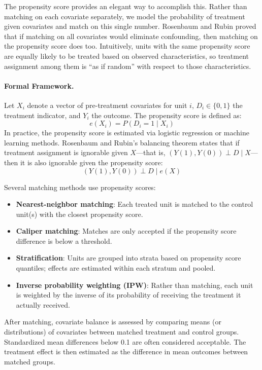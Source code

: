 The propensity score provides an elegant way to accomplish this.
Rather than matching on each covariate separately, we model the probability of treatment given covariates and match on this single number.
Rosenbaum and Rubin proved that if matching on all covariates would eliminate confounding, then matching on the propensity score does too.
Intuitively, units with the same propensity score are equally likely to be treated based on observed characteristics, so treatment assignment among them is ``as if random'' with respect to those characteristics.

\paragraph{Formal Framework.}
Let $X_i$ denote a vector of pre-treatment covariates for unit $i$, $D_i \in \{0,1\}$ the treatment indicator, and $Y_i$ the outcome.
The propensity score is defined as:
\begin{equation}
    e(X_i) = P(D_i = 1 \mid X_i)
\end{equation}
In practice, the propensity score is estimated via logistic regression or machine learning methods.
Rosenbaum and Rubin's balancing theorem states that if treatment assignment is ignorable given $X$---that is, $(Y(1), Y(0)) \perp D \mid X$---then it is also ignorable given the propensity score:
\begin{equation}
    (Y(1), Y(0)) \perp D \mid e(X)
\end{equation}

Several matching methods use propensity scores:
\begin{itemize}[leftmargin=15pt]
    \item \textbf{Nearest-neighbor matching}: Each treated unit is matched to the control unit(s) with the closest propensity score.
    \item \textbf{Caliper matching}: Matches are only accepted if the propensity score difference is below a threshold.
    \item \textbf{Stratification}: Units are grouped into strata based on propensity score quantiles; effects are estimated within each stratum and pooled.
    \item \textbf{Inverse probability weighting (IPW)}: Rather than matching, each unit is weighted by the inverse of its probability of receiving the treatment it actually received.
\end{itemize}

After matching, covariate balance is assessed by comparing means (or distributions) of covariates between matched treatment and control groups.
Standardized mean differences below 0.1 are often considered acceptable.
The treatment effect is then estimated as the difference in mean outcomes between matched groups.


